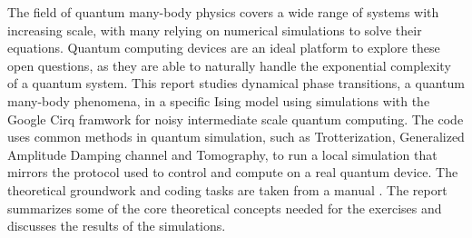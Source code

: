 The field of quantum many-body physics covers a wide range of systems with increasing scale, with many relying on numerical simulations to solve their equations. Quantum computing devices are an ideal platform to explore these open questions, as they are able to naturally handle the exponential complexity of a quantum system. This report studies dynamical phase transitions, a quantum many-body phenomena, in a specific Ising model using simulations with the Google Cirq framwork for noisy intermediate scale quantum computing. The code uses common methods in quantum simulation, such as Trotterization, Generalized Amplitude Damping channel and Tomography, to run a local simulation that mirrors the protocol used to control and compute on a real quantum device. The theoretical groundwork and coding tasks are taken from a manual \cite{manual}. The report summarizes some of the core theoretical concepts needed for the exercises and discusses the results of the simulations.